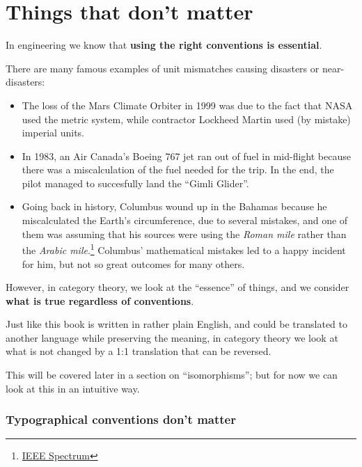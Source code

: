 \section{Things that don't matter}

In engineering we know that \textbf{using the right conventions is essential}.

There are many famous examples of unit mismatches causing disasters or near-disasters:
\begin{itemize}
    \item The loss of the Mars Climate Orbiter in 1999 was due to the fact that NASA used the metric system,
    while contractor Lockheed Martin used (by mistake) imperial units.
    \item In 1983, an Air Canada’s Boeing 767 jet ran out of fuel in mid-flight because
    there was a miscalculation of the fuel needed for the trip. In the end, the pilot managed to succesfully land the ``Gimli Glider''.
    \item
    Going back in history, Columbus wound up in the Bahamas because he miscalculated
    the Earth's circumference, due to several mistakes, and one of them was assuming
    that his sources were using the \emph{Roman mile} rather than the \emph{Arabic mile}.\footnote{
        \href{https://spectrum.ieee.org/tech-talk/at-work/test-and-measurement/columbuss-geographical-miscalculations}{IEEE Spectrum}
    }
    Columbus' mathematical mistakes led to a happy incident for him, but not so great outcomes for many others.
\end{itemize}

However, in category theory, we look at the ``essence'' of things, and we consider \textbf{what is true regardless of conventions}.

Just like this book is written in rather plain English, and could be translated to another language while preserving the meaning, in category theory we look at what is not changed by a 1:1 translation that can be reversed.

This will be covered later in a section on ``isomorphisms''; but for now we can look at this in an intuitive way.

\subsubsection{Typographical conventions don't matter}

